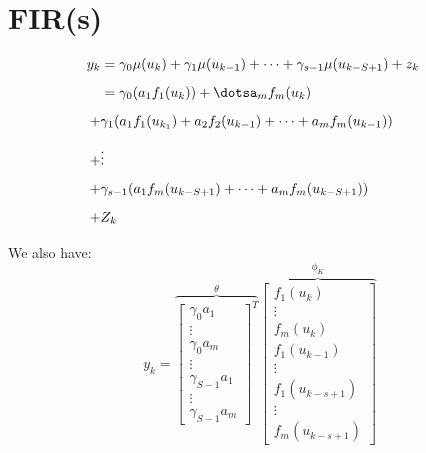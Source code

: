  \section{FIR(s)}
 \begin{equation}
     \begin{aligned}
         y_k &= \gamma_0\mu(u_k)+\gamma_1\mu(u_{k-1}) + \dots +\gamma_{s-1}\mu(u_{k-S+1}) + z_k  &\mbox{}\\[1.25ex]
             &=\gamma_0(a_1f_1(u_k))+\dotsa_mf_m(u_k)&\mbox{}\\[1.25ex]
         +&\gamma_1(a_1f_1(u_{k_1})+a_2f_2(u_{k-1})+\dots+a_mf_m(u_{k-1}))&\mbox{}\\[1.25ex]
         +&\vdots&\mbox{}\\[1.25ex]
         +&\gamma_{s-1}(a_1f_m(u_{k-S+1})+\dots + a_mf_m(u_{k-S+1}))&\mbox{}\\[1.25ex]
         +&Z_k&\mbox{}\\[1.25ex]
     \end{aligned}
 \end{equation}
 We also have:
 \begin{equation}
     y_k = \overbrace{\begin{bmatrix}
         \gamma_0a_1 \\
         \vdots \\
         \gamma_{0}a_m\\
         \vdots\\
         \gamma_{S-1}a_1\\
         \vdots\\
         \gamma_{S-1}a_m
 \end{bmatrix}^{T}}^{\theta}
     \overbrace{
     \begin{bmatrix}
         f_1(u_k) \\
         \vdots\\
         f_m(u_k)\\
         f_1(u_{k-1})\\
         \vdots\\
         f_1(u_{k-s+1})\\
         \vdots \\
         f_m (u_{k-s+1})
 \end{bmatrix}}^{\phi_K}
 \end{equation}

